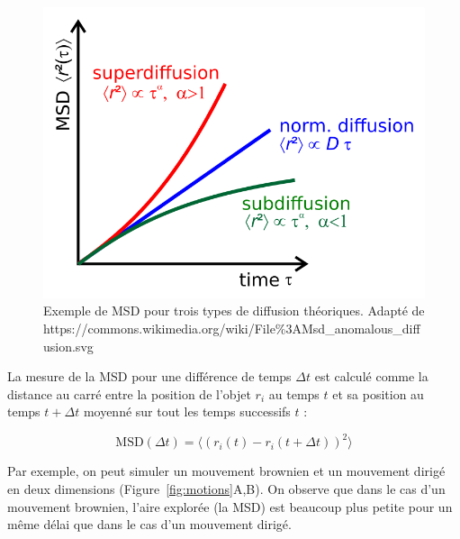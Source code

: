 \documentclass[12pt,a4paper,twoside,openright]{book}
\begin{document}
\begin{figure}[htbp]
\centering
\includegraphics{figures/results/imaging/wiki_diffuse.png}
\caption[Exemple de MSD pour trois types de diffusion théoriques]{\label{fig:wiki_diffuse}Exemple
de MSD pour trois types de diffusion théoriques. Adapté de
https://commons.wikimedia.org/wiki/File\%3AMsd\_anomalous\_diffusion.svg}
\end{figure}

La mesure de la MSD pour une différence de temps \(\Delta t\) est
calculé comme la distance au carré entre la position de l'objet \(r_i\)
au temps \(t\) et sa position au temps \(t+\Delta t\) moyenné sur tout
les temps successifs \(t\) :

\[
\mbox{MSD}(\Delta t) = \langle (r_i(t) - r_i(t + \Delta t)) ^ 2 \rangle
\]

Par exemple, on peut simuler un mouvement brownien et un mouvement
dirigé en deux dimensions (Figure~\ref{fig:motions}A,B). On observe que
dans le cas d'un mouvement brownien, l'aire explorée (la MSD) est
beaucoup plus petite pour un même délai que dans le cas d'un mouvement
dirigé.
\end{document}
